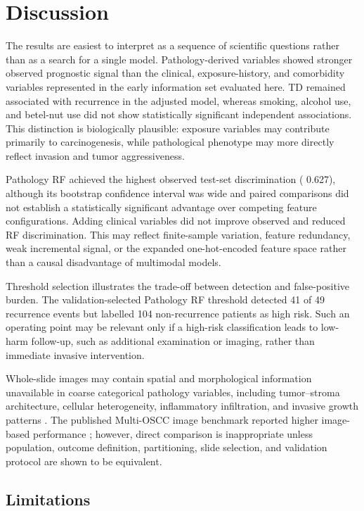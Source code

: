 \documentclass[11pt,a4paper]{article}
\newcommand{\ROC}{\text{ROC-AUC}}
\begin{document}
\section{Discussion}

The results are easiest to interpret as a sequence of scientific questions rather than as a search for a single model. Pathology-derived variables showed stronger observed prognostic signal than the clinical, exposure-history, and comorbidity variables represented in the early information set evaluated here. TD remained associated with recurrence in the adjusted model, whereas smoking, alcohol use, and betel-nut use did not show statistically significant independent associations. This distinction is biologically plausible: exposure variables may contribute primarily to carcinogenesis, while pathological phenotype may more directly reflect invasion and tumor aggressiveness.

Pathology RF achieved the highest observed test-set discrimination (\ROC{} 0.627), although its bootstrap confidence interval was wide and paired comparisons did not establish a statistically significant advantage over competing feature configurations. Adding clinical variables did not improve observed \ROC{} and reduced RF discrimination. This may reflect finite-sample variation, feature redundancy, weak incremental signal, or the expanded one-hot-encoded feature space rather than a causal disadvantage of multimodal models.

Threshold selection illustrates the trade-off between detection and false-positive burden. The validation-selected Pathology RF threshold detected 41 of 49 recurrence events but labelled 104 non-recurrence patients as high risk. Such an operating point may be relevant only if a high-risk classification leads to low-harm follow-up, such as additional examination or imaging, rather than immediate invasive intervention.

Whole-slide images may contain spatial and morphological information unavailable in coarse categorical pathology variables, including tumor--stroma architecture, cellular heterogeneity, inflammatory infiltration, and invasive growth patterns \cite{almangush_staging_2020}. The published Multi-OSCC image benchmark reported higher image-based performance \cite{guan2026multi}; however, direct comparison is inappropriate unless population, outcome definition, partitioning, slide selection, and validation protocol are shown to be equivalent.

\subsection{Limitations}
\end{document}
